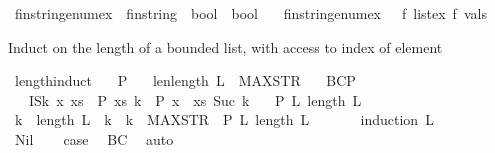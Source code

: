 \begin{isabellebody}
\isamarkupfalse%
\ fin{\isacharunderscore}string{\isacharunderscore}enum{\isacharunderscore}ex\ {\isacharcolon}{\isacharcolon}\ {\isachardoublequoteopen}{\isacharparenleft}fin{\isacharunderscore}string\ {\isasymRightarrow}\ bool{\isacharparenright}\ {\isasymRightarrow}\ bool{\isachardoublequoteclose}\isanewline
\ \ \ {\isachardoublequoteopen}fin{\isacharunderscore}string{\isacharunderscore}enum{\isacharunderscore}ex\ {\isacharequal}\ {\isacharparenleft}{\isasymlambda}\ f{\isachardot}\ list{\isacharunderscore}ex\ f\ vals{\isacharparenright}{\isachardoublequoteclose}%
\begin{isamarkuptext}%
Induct on the length of a bounded list, with access to index of element%
\end{isamarkuptext}\isamarkuptrue%
\isamarkupfalse%
\ length{\isacharunderscore}induct{\isacharcolon}\isanewline
\ \ \ P\isanewline
\ \ \ len{\isacharcolon}{\isachardoublequoteopen}length\ L\ {\isasymle}\ MAX{\isacharunderscore}STR{\isachardoublequoteclose}\isanewline
\ \ \ BC{\isacharcolon}{\isachardoublequoteopen}P\ {\isacharbrackleft}{\isacharbrackright}\ {}{\isachardoublequoteclose}\isanewline
\ \ \ IS{\isacharcolon}{\isachardoublequoteopen}{\isacharparenleft}{\isasymAnd}k\ x\ xs{\isachardot}\ \ P\ xs\ k\ {\isasymLongrightarrow}\ P\ {\isacharparenleft}{\isacharparenleft}x\ {\isacharhash}\ xs{\isacharparenright}{\isacharparenright}\ {\isacharparenleft}Suc\ k{\isacharparenright}{\isacharparenright}{\isachardoublequoteclose}\isanewline
\ \ \ {\isachardoublequoteopen}P\ L\ {\isacharparenleft}length\ L{\isacharparenright}{\isachardoublequoteclose}\isanewline
%
\isadelimproof
\ \ %
\endisadelimproof
%
\isatagproof
{}\isamarkupfalse%
\ {\isacharminus}\isanewline
\ \ \ \ \isamarkupfalse%
\ {\isachardoublequoteopen}{\isasymAnd}k{\isachardot}\ \ length\ L\ {\isacharequal}\ k\ {\isasymLongrightarrow}\ k\ {\isasymle}\ MAX{\isacharunderscore}STR\ {\isasymLongrightarrow}\ P\ L\ {\isacharparenleft}length\ L{\isacharparenright}{\isachardoublequoteclose}\ \isanewline
\ \ \ \ \isamarkupfalse%
\ {\isacharparenleft}induction\ L{\isacharparenright}\isanewline
\ \ \ \ \ \ \isamarkupfalse%
\ Nil\ \isamarkupfalse%
\ \isamarkupfalse%
\ {\isacharquery}case\ \isamarkupfalse%
\ BC\ \isamarkupfalse%
\ auto\isanewline
\ \ \ \ \isamarkupfalse%

\end{isabellebody}

